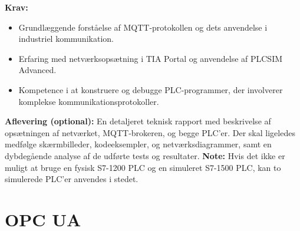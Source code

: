 \textbf{Krav:}
\begin{itemize}
	\item Grundlæggende forståelse af MQTT-protokollen og dets anvendelse i industriel kommunikation.
	\item Erfaring med netværksopsætning i TIA Portal og anvendelse af PLCSIM Advanced.
	\item Kompetence i at konstruere og debugge PLC-programmer, der involverer komplekse kommunikationsprotokoller.
\end{itemize}

\noindent\textbf{Aflevering (optional):} En detaljeret teknisk rapport med beskrivelse af opsætningen af netværket, MQTT-brokeren, og begge PLC'er. Der skal ligeledes medfølge skærmbilleder, kodeeksempler, og netværksdiagrammer, samt en dybdegående analyse af de udførte tests og resultater.
\newline\newline
\noindent\textbf{Note:} Hvis det ikke er muligt at bruge en fysisk S7-1200 PLC og en simuleret S7-1500 PLC, kan to simulerede PLC'er anvendes i stedet.


\section{OPC UA}
\label{subsec:opcua_communication_plcsim_advanced}

